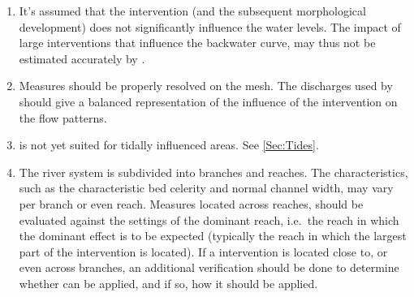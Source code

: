 \begin{enumerate}
\item It's assumed that the intervention (and the subsequent morphological development) does not significantly influence the water levels.
The impact of large interventions that influence the backwater curve, may thus not be estimated accurately by \dfmi.

\item Measures should be properly resolved on the \dflowfm mesh.
The discharges used by \dfmi should give a balanced representation of the influence of the intervention on the flow patterns.

\item \dfastmi is not yet suited for tidally influenced areas.
See \autoref{Sec:Tides}.

\item The river system is subdivided into branches and reaches.
The characteristics, such as the characteristic bed celerity and normal channel width, may vary per branch or even reach.
Measures located across reaches, should be evaluated against the settings of the dominant reach, i.e.~the reach in which the dominant effect is to be expected (typically the reach in which the largest part of the intervention is located).
If a intervention is located close to, or even across branches, an additional verification should be done to determine whether \dfmi can be applied, and if so, how it should be applied.


\end{enumerate}
